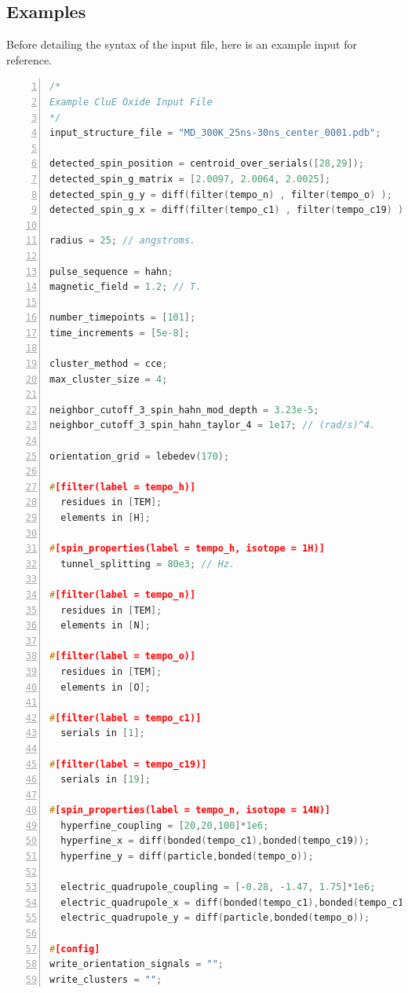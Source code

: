 \documentclass{book}
\begin{document}
\subsection{Examples}
Before detailing the syntax of the input file, here is an example input for
reference.
\begin{lstlisting}[frame=single,numbers=left,language=c]
/*
Example CluE Oxide Input File
*/
input_structure_file = "MD_300K_25ns-30ns_center_0001.pdb";

detected_spin_position = centroid_over_serials([28,29]);
detected_spin_g_matrix = [2.0097, 2.0064, 2.0025];
detected_spin_g_y = diff(filter(tempo_n) , filter(tempo_o) );
detected_spin_g_x = diff(filter(tempo_c1) , filter(tempo_c19) );

radius = 25; // angstroms.

pulse_sequence = hahn;
magnetic_field = 1.2; // T.

number_timepoints = [101];
time_increments = [5e-8];

cluster_method = cce;
max_cluster_size = 4;

neighbor_cutoff_3_spin_hahn_mod_depth = 3.23e-5; 
neighbor_cutoff_3_spin_hahn_taylor_4 = 1e17; // (rad/s)^4.

orientation_grid = lebedev(170);

#[filter(label = tempo_h)]
  residues in [TEM];
  elements in [H];

#[spin_properties(label = tempo_h, isotope = 1H)]
  tunnel_splitting = 80e3; // Hz.

#[filter(label = tempo_n)]
  residues in [TEM];
  elements in [N];

#[filter(label = tempo_o)]
  residues in [TEM];
  elements in [O];

#[filter(label = tempo_c1)]
  serials in [1];

#[filter(label = tempo_c19)]
  serials in [19];
  
#[spin_properties(label = tempo_n, isotope = 14N)]
  hyperfine_coupling = [20,20,100]*1e6;
  hyperfine_x = diff(bonded(tempo_c1),bonded(tempo_c19));
  hyperfine_y = diff(particle,bonded(tempo_o));

  electric_quadrupole_coupling = [-0.28, -1.47, 1.75]*1e6;
  electric_quadrupole_x = diff(bonded(tempo_c1),bonded(tempo_c19));
  electric_quadrupole_y = diff(particle,bonded(tempo_o));

#[config]
write_orientation_signals = "";
write_clusters = "";
\end{lstlisting}
\end{document}
